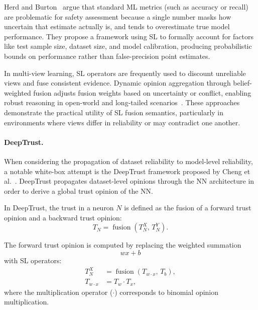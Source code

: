 Herd and Burton~\cite{10.1145/3605098.3635966} argue that standard ML metrics (such as accuracy or recall) are problematic for safety assessment because a single number masks how uncertain that estimate actually is, and tends to overestimate true model performance. They propose a framework using \ac{SL} to formally account for factors like test sample size, dataset size, and model calibration, producing probabilistic bounds on performance rather than false-precision point estimates.

In multi-view learning, \ac{SL} operators are frequently used to discount unreliable views and fuse consistent evidence. Dynamic opinion aggregation through belief-weighted fusion adjusts fusion weights based on uncertainty or conflict, enabling robust reasoning in open-world and long-tailed scenarios~\cite{ZUO2026129453,10.1145/3746027.3755015}. These approaches demonstrate the practical utility of \ac{SL} fusion semantics, particularly in environments where views differ in reliability or may contradict one another.



\paragraph{DeepTrust.}

When considering the propagation of dataset reliability to model-level reliability, 
a notable white-box attempt is the DeepTrust framework proposed by 
Cheng et al.~\cite{10.3389/frai.2020.00054}. 
DeepTrust propagates dataset-level opinions through the \ac{NN} architecture in order to derive a global trust opinion of the \ac{NN}.

In DeepTrust, the trust in a neuron $N$ is defined as the fusion of a forward 
trust opinion and a backward trust opinion:
\begin{equation}
    T_N = \operatorname{fusion}\!\left(
        T^{X}_N,\,
        T^{Y}_N
    \right).
\end{equation}

The forward trust opinion is computed by replacing the weighted summation 
\[
w x + b
\]
with \ac{SL} operators:
\begin{align}
    T^{X}_N 
    &= \operatorname{fusion}\!\left(
        T_{w \cdot x},\, T_b
    \right), \\
    T_{w \cdot x}
    &= T_w \cdot T_x ,
\end{align}
where the multiplication operator (\(\cdot\)) corresponds to binomial opinion multiplication.

